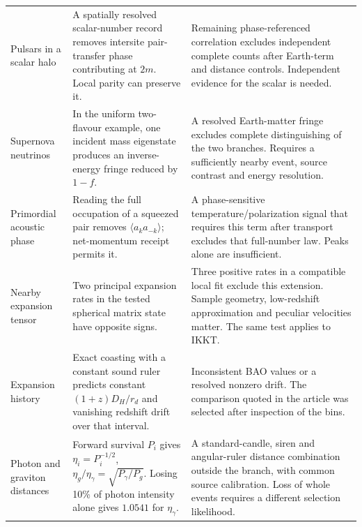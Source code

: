 \begin{longtable}{@{}L{.215\linewidth}L{.36\linewidth}L{.36\linewidth}@{}}
Pulsars in a scalar halo & A spatially resolved scalar-number record removes intersite pair-transfer phase contributing at \(2m\). Local parity can preserve it. & Remaining phase-referenced correlation excludes independent complete counts after Earth-term and distance controls. Independent evidence for the scalar is needed.\\[3pt]
Supernova neutrinos & In the uniform two-flavour example, one incident mass eigenstate produces an inverse-energy fringe reduced by \(1-f\). & A resolved Earth-matter fringe excludes complete distinguishing of the two branches. Requires a sufficiently nearby event, source contrast and energy resolution.\\[3pt]
Primordial acoustic phase & Reading the full occupation of a squeezed pair removes \(\langle a_k a_{-k}\rangle\); net-momentum receipt permits it. & A phase-sensitive temperature/polarization signal that requires this term after transport excludes that full-number law. Peaks alone are insufficient.\\[3pt]
Nearby expansion tensor & Two principal expansion rates in the tested spherical matrix state have opposite signs. & Three positive rates in a compatible local fit exclude this extension. Sample geometry, low-redshift approximation and peculiar velocities matter. The same test applies to IKKT.\\[3pt]
Expansion history & Exact coasting with a constant sound ruler predicts constant \((1+z)D_H/r_d\) and vanishing redshift drift over that interval. & Inconsistent BAO values or a resolved nonzero drift. The comparison quoted in the article was selected after inspection of the bins.\\[3pt]
Photon and graviton distances & Forward survival \(P_i\) gives \(\eta_i=P_i^{-1/2}\), \(\eta_g/\eta_\gamma=\sqrt{P_\gamma/P_g}\). Losing 10\% of photon intensity alone gives \(1.0541\) for \(\eta_\gamma\). & A standard-candle, siren and angular-ruler distance combination outside the branch, with common source calibration. Loss of whole events requires a different selection likelihood.\\
\bottomrule\end{longtable}
\normalsize
